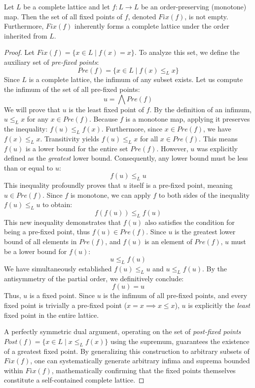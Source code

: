 \begin{theorem}
Let $L$ be a complete lattice and let $f: L \to L$ be an order-preserving (monotone) map. Then the set of all fixed points of $f$, denoted $Fix(f)$, is not empty. Furthermore, $Fix(f)$ inherently forms a complete lattice under the order inherited from $L$.
\end{theorem}
\begin{proof}
Let $Fix(f) = \{x \in L \mid f(x) = x\}$. To analyze this set, we define the auxiliary set of \emph{pre-fixed points}:
\[ Pre(f) = \{x \in L \mid f(x) \leq_L x\} \]
Since $L$ is a complete lattice, the infimum of any subset exists. Let us compute the infimum of the set of all pre-fixed points:
\[ u = \bigwedge Pre(f) \]
We will prove that $u$ is the least fixed point of $f$. 
By the definition of an infimum, $u \leq_L x$ for any $x \in Pre(f)$. 
Because $f$ is a monotone map, applying it preserves the inequality: $f(u) \leq_L f(x)$. 
Furthermore, since $x \in Pre(f)$, we have $f(x) \leq_L x$. 
Transitivity yields $f(u) \leq_L x$ for all $x \in Pre(f)$. 
This means $f(u)$ is a lower bound for the entire set $Pre(f)$. However, $u$ was explicitly defined as the \emph{greatest} lower bound. Consequently, any lower bound must be less than or equal to $u$:
\[ f(u) \leq_L u \]
This inequality profoundly proves that $u$ itself is a pre-fixed point, meaning $u \in Pre(f)$. 
Since $f$ is monotone, we can apply $f$ to both sides of the inequality $f(u) \leq_L u$ to obtain:
\[ f(f(u)) \leq_L f(u) \]
This new inequality demonstrates that $f(u)$ also satisfies the condition for being a pre-fixed point, thus $f(u) \in Pre(f)$.
Since $u$ is the greatest lower bound of all elements in $Pre(f)$, and $f(u)$ is an element of $Pre(f)$, $u$ must be a lower bound for $f(u)$:
\[ u \leq_L f(u) \]
We have simultaneously established $f(u) \leq_L u$ and $u \leq_L f(u)$. By the antisymmetry of the partial order, we definitively conclude:
\[ f(u) = u \]
Thus, $u$ is a fixed point. Since $u$ is the infimum of all pre-fixed points, and every fixed point is trivially a pre-fixed point ($x=x \implies x \leq x$), $u$ is explicitly the \emph{least} fixed point in the entire lattice.

A perfectly symmetric dual argument, operating on the set of \emph{post-fixed points} $Post(f) = \{x \in L \mid x \leq_L f(x)\}$ using the supremum, guarantees the existence of a greatest fixed point.
By generalizing this construction to arbitrary subsets of $Fix(f)$, one can systematically generate arbitrary infima and suprema bounded within $Fix(f)$, mathematically confirming that the fixed points themselves constitute a self-contained complete lattice.
\end{proof}

